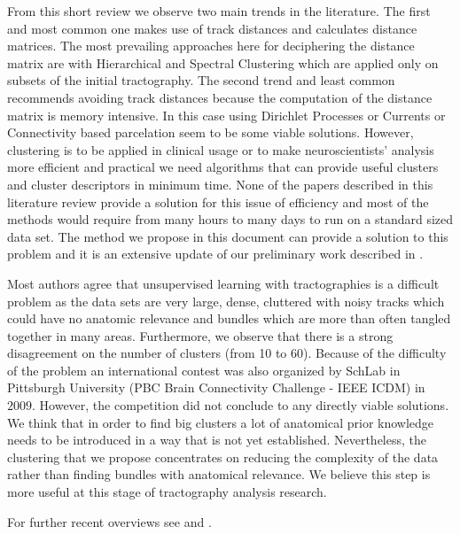 \documentclass{bioinfo}
\begin{document}
From this short review we observe two main trends in the literature.
The first and most common one makes use of track distances and
calculates distance matrices. The most prevailing approaches here for
deciphering the distance matrix are with Hierarchical and Spectral
Clustering which are applied only on subsets of the initial
tractography. The second trend and least common recommends avoiding
track distances because the computation of the distance matrix is memory
intensive.  In this case using Dirichlet Processes or Currents or
Connectivity based parcelation seem to be some viable
solutions. However, clustering is to be applied in clinical usage or to
make neuroscientists' analysis more efficient and practical we need
algorithms that can provide useful clusters and cluster descriptors in
minimum time. None of the papers described in this literature review
provide a solution for this issue of efficiency and most of the methods
would require from many hours to many days to run on a standard sized
data set. The method we propose in this document can provide a solution
to this problem and it is an extensive update of our preliminary work
described in \citet{EGMB10}.

Most authors agree that unsupervised learning with tractographies is a
difficult problem as the data sets are very large, dense, cluttered with
noisy tracks which could have no anatomic relevance and bundles which
are more than often tangled together in many areas. Furthermore, we
observe that there is a strong disagreement on the number of clusters
(from 10 to 60). Because of the difficulty of the problem an
international contest was also organized by SchLab in Pittsburgh
University (PBC Brain Connectivity Challenge - IEEE ICDM) in
$2009$. However, the competition did not conclude to any directly viable
solutions. We think that in order to find big clusters a lot of
anatomical prior knowledge needs to be introduced in a way that is not
yet established.  Nevertheless, the clustering that we propose
concentrates on reducing the complexity of the data rather than finding
bundles with anatomical relevance. We believe this step is more useful
at this stage of tractography analysis research.

For further recent overviews see \citet{ODonnell_IEEETMI07} and
\citet{wang2010tractography}.
\end{document}
